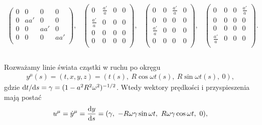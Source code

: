 $$
\begin{array}{cccc}
\left(
    \begin{array}{cccc}
    0 & 0 & 0 & 0 \\
    0 & a a' & 0 & 0 \\
    0 & 0 & a a' & 0 \\
    0 & 0 & 0 & a a' \\
    \end{array}
    \right), &
    \left(
    \begin{array}{cccc}
    0 & \frac{a'}{a} & 0 & 0 \\
    \frac{a'}{a} & 0 & 0 & 0 \\
    0 & 0 & 0 & 0 \\
    0 & 0 & 0 & 0 \\
    \end{array}
    \right), &
    \left(
    \begin{array}{cccc}
    0 & 0 & \frac{a'}{a} & 0 \\
    0 & 0 & 0 & 0 \\
    \frac{a'}{a} & 0 & 0 & 0 \\
    0 & 0 & 0 & 0 \\
    \end{array}
    \right), &
    \left(
    \begin{array}{cccc}
    0 & 0 & 0 & \frac{a'}{a} \\
    0 & 0 & 0 & 0 \\
    0 & 0 & 0 & 0 \\
    \frac{a'}{a} & 0 & 0 & 0 \\
    \end{array}
    \right). \\
\end{array}
 $$ 
 \\
Rozważamy linie świata cząstki w ruchu po okręgu 
\begin{align}\nonumber
y^\mu(s) = (t,x,y,z)= (t(s),\ R\cos\omega t(s),\ R\sin\omega t(s),\ 0),
\end{align}  
gdzie $\text{d} t/\text{d} s=\gamma= (1-a^2R^2\omega^2)^{-1/2}$.
Wtedy wektory prędkości i przyspieszenia mają postać 
\begin{align}\nonumber
u^\mu = \dot{y}^\mu = \frac{\text{d} y}{\text{d} s} = 
(\gamma,\ -R\omega\gamma\sin\omega t,
\ R\omega\gamma\cos\omega t,\ 0),
\end{align}
